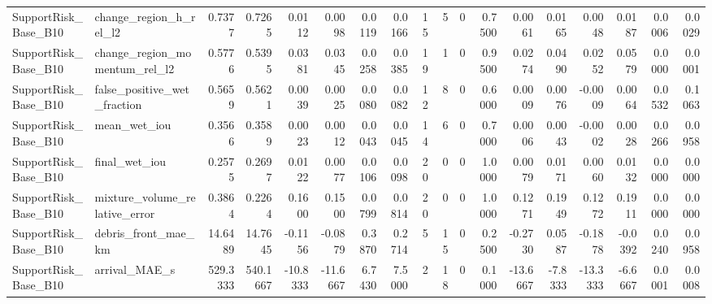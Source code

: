 \begin{tabular}{llrrrrrrrrrrrrrrrr}
SupportRisk_Base_B10 & change_region_h_rel_l2 & 0.7377 & 0.7265 & 0.0112 & 0.0098 & 0.0119 & 0.0166 & 15 & 5 & 0 & 0.7500 & 0.0061 & 0.0165 & 0.0048 & 0.0187 & 0.0006 & 0.0029 \\
SupportRisk_Base_B10 & change_region_momentum_rel_l2 & 0.5776 & 0.5395 & 0.0381 & 0.0345 & 0.0258 & 0.0385 & 19 & 1 & 0 & 0.9500 & 0.0274 & 0.0490 & 0.0252 & 0.0579 & 0.0000 & 0.0001 \\
SupportRisk_Base_B10 & false_positive_wet_fraction & 0.5659 & 0.5621 & 0.0039 & 0.0025 & 0.0080 & 0.0082 & 12 & 8 & 0 & 0.6000 & 0.0009 & 0.0076 & -0.0009 & 0.0064 & 0.0532 & 0.1063 \\
SupportRisk_Base_B10 & mean_wet_iou & 0.3566 & 0.3589 & 0.0023 & 0.0012 & 0.0043 & 0.0045 & 14 & 6 & 0 & 0.7000 & 0.0006 & 0.0043 & -0.0002 & 0.0028 & 0.0266 & 0.0958 \\
SupportRisk_Base_B10 & final_wet_iou & 0.2575 & 0.2697 & 0.0122 & 0.0077 & 0.0106 & 0.0098 & 20 & 0 & 0 & 1.0000 & 0.0079 & 0.0171 & 0.0060 & 0.0132 & 0.0000 & 0.0000 \\
SupportRisk_Base_B10 & mixture_volume_relative_error & 0.3864 & 0.2264 & 0.1600 & 0.1500 & 0.0799 & 0.0814 & 20 & 0 & 0 & 1.0000 & 0.1271 & 0.1949 & 0.1272 & 0.1911 & 0.0000 & 0.0000 \\
SupportRisk_Base_B10 & debris_front_mae_km & 14.6489 & 14.7645 & -0.1156 & -0.0879 & 0.3870 & 0.2714 & 5 & 15 & 0 & 0.2500 & -0.2730 & 0.0587 & -0.1878 & -0.0392 & 0.0240 & 0.0958 \\
SupportRisk_Base_B10 & arrival_MAE_s & 529.3333 & 540.1667 & -10.8333 & -11.6667 & 6.7430 & 7.5000 & 2 & 18 & 0 & 0.1000 & -13.6667 & -7.8333 & -13.3333 & -6.6667 & 0.0001 & 0.0008 \\
\bottomrule
\end{tabular}
